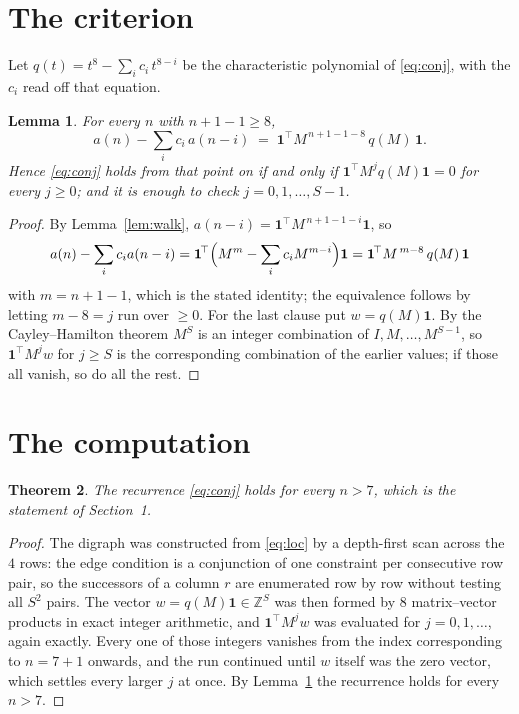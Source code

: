 \documentclass[11pt,a4paper]{article}
\theoremstyle{plain}
\newtheorem{theorem}{Theorem}
\newtheorem{lemma}[theorem]{Lemma}
\theoremstyle{definition}
\begin{document}
\section{The criterion}

Let $q(t)=t^{8}-\sum_i c_i\,t^{8-i}$ be the characteristic polynomial of
\eqref{eq:conj}, with the $c_i$ read off that equation.

\begin{lemma}\label{lem:crit}
For every $n$ with $n+1-1\ge8$,
\[
a(n)-\sum_i c_i\,a(n-i)\;=\;\mathbf{1}^{\!\top}M^{\,n+1-1-8}\,q(M)\,\mathbf{1} .
\]
Hence \eqref{eq:conj} holds from that point on if and only if
$\mathbf{1}^{\!\top}M^{j}q(M)\mathbf{1}=0$ for every $j\ge0$; and it is enough to check
$j=0,1,\dots,S-1$.
\end{lemma}

\begin{proof}
By Lemma~\ref{lem:walk}, $a(n-i)=\mathbf{1}^{\!\top}M^{\,n+1-1-i}\mathbf{1}$, so
\[
a(n)-\sum_i c_i a(n-i)
=\mathbf{1}^{\!\top}\Bigl(M^{m}-\sum_i c_i M^{m-i}\Bigr)\mathbf{1}
=\mathbf{1}^{\!\top}M^{\,m-8}\,q(M)\,\mathbf{1}
\]
with $m=n+1-1$, which is the stated identity; the equivalence follows by letting
$m-8=j$ run over $\ge0$. For the last clause put $w=q(M)\mathbf{1}$. By the
Cayley--Hamilton theorem $M^{S}$ is an integer combination of $I,M,\dots,M^{S-1}$, so
$\mathbf{1}^{\!\top}M^{j}w$ for $j\ge S$ is the corresponding combination of the earlier
values; if those all vanish, so do all the rest.
\end{proof}

\section{The computation}

\begin{theorem}
The recurrence \eqref{eq:conj} holds for every $n>7$, which is the statement of
Section~1.
\end{theorem}

\begin{proof}
The digraph was constructed from \eqref{eq:loc} by a depth-first scan across the $4$
rows: the edge condition is a conjunction of one constraint per consecutive row
pair, so the successors of a column $r$ are enumerated row by row without testing all
$S^2$ pairs. The vector $w=q(M)\mathbf{1}\in\mathbb{Z}^{S}$ was then formed by $8$
matrix--vector products in exact integer arithmetic, and $\mathbf{1}^{\!\top}M^{j}w$ was
evaluated for $j=0,1,\dots$, again exactly. Every one of those integers vanishes from the
index corresponding to $n=7+1$ onwards, and the run continued until $w$ itself was the
zero vector, which settles every larger $j$ at once. By Lemma~\ref{lem:crit} the recurrence
holds for every $n>7$.
\end{proof}
\end{document}

